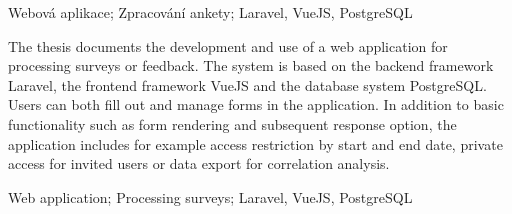 \noindent Webová aplikace; Zpracování ankety; Laravel, VueJS, PostgreSQL

\vspace{18pt}


\noindent
The thesis documents the development and use of a web application for processing surveys or feedback. The system is based on the backend framework Laravel, the frontend framework VueJS and the database system PostgreSQL. Users can both fill out and manage forms in the application. In addition to basic functionality such as form rendering and subsequent response option, the application includes for example access restriction by start and end date, private access for invited users or data export for correlation analysis.

\vspace{18pt}


\noindent Web application; Processing surveys; Laravel, VueJS, PostgreSQL

\cleardoublepage

\tableofcontents

\cleardoublepage